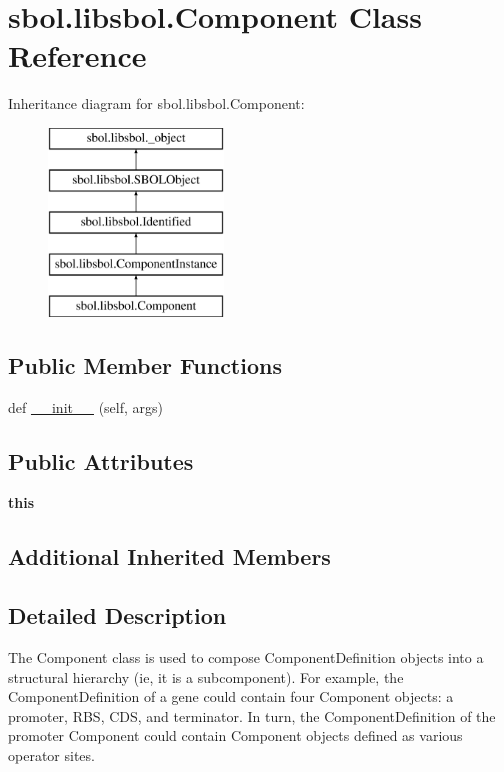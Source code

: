\hypertarget{classsbol_1_1libsbol_1_1_component}{}\section{sbol.\+libsbol.\+Component Class Reference}
\label{classsbol_1_1libsbol_1_1_component}
Inheritance diagram for sbol.\+libsbol.\+Component\+:\begin{figure}[H]
\begin{center}
\leavevmode
\includegraphics[height=5.000000cm]{classsbol_1_1libsbol_1_1_component}
\end{center}
\end{figure}
\subsection*{Public Member Functions}
\begin{DoxyCompactItemize}
\item 
def \hyperlink{classsbol_1_1libsbol_1_1_component_a577f1e875bd1e8cc428b1c08a01ee814}{\+\_\+\+\_\+init\+\_\+\+\_\+} (self, args)
\end{DoxyCompactItemize}
\subsection*{Public Attributes}
\begin{DoxyCompactItemize}
\item 
{\bfseries this}\hypertarget{classsbol_1_1libsbol_1_1_component_aeb6840b571e8f7a9d809120f5fc459cf}{}\label{classsbol_1_1libsbol_1_1_component_aeb6840b571e8f7a9d809120f5fc459cf}

\end{DoxyCompactItemize}
\subsection*{Additional Inherited Members}


\subsection{Detailed Description}
\begin{DoxyVerb}The Component class is used to compose ComponentDefinition objects into a structural hierarchy (ie, it is a subcomponent). For example, the ComponentDefinition of a gene could contain four Component objects: a promoter, RBS, CDS, and terminator. In turn, the ComponentDefinition of the promoter Component could contain Component objects defined as various operator sites.\end{DoxyVerb}
 

